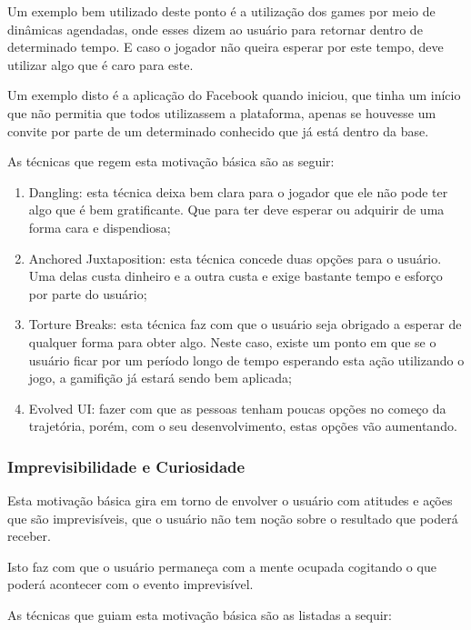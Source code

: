 Um exemplo bem utilizado deste ponto é a utilização dos games por meio de dinâmicas
agendadas, onde esses dizem ao usuário para retornar dentro de determinado tempo.
E caso o jogador não queira esperar por este tempo, deve utilizar algo que é caro
para este.

Um exemplo disto é a aplicação do Facebook quando iniciou, que tinha um início que não permitia
que todos utilizassem a plataforma, apenas se houvesse um convite por parte de um
determinado conhecido que já está dentro da base.

As técnicas que regem esta motivação básica são as seguir:

\begin{enumerate}
    \item Dangling: esta técnica deixa bem clara para o jogador que ele não pode
        ter algo que é bem gratificante. Que para ter deve esperar ou adquirir
        de uma forma cara e dispendiosa;
    \item Anchored Juxtaposition: esta técnica concede duas opções para o usuário.
        Uma delas custa dinheiro e a outra custa e exige bastante tempo e esforço
        por parte do usuário;
    \item Torture Breaks: esta técnica faz com que o usuário seja obrigado a esperar
        de qualquer forma para obter algo. Neste caso, existe um ponto em que
        se o usuário ficar por um período longo de tempo esperando esta ação
        utilizando o jogo, a gamifição já estará sendo bem aplicada;
    \item Evolved UI: fazer com que as pessoas tenham poucas opções no começo da
        trajetória, porém, com o seu desenvolvimento, estas opções vão aumentando.
\end{enumerate}

\subsubsection{Imprevisibilidade e Curiosidade}
\label{sub:imprevisibilidadeecuriosidade}
Esta motivação básica gira em torno de envolver o usuário com atitudes e ações que são
imprevisíveis, que o usuário não tem noção sobre o resultado que poderá receber.

Isto faz com que o usuário permaneça com a mente ocupada cogitando o que poderá
acontecer com o evento imprevisível.

As técnicas que guiam esta motivação básica são as listadas a sequir:

